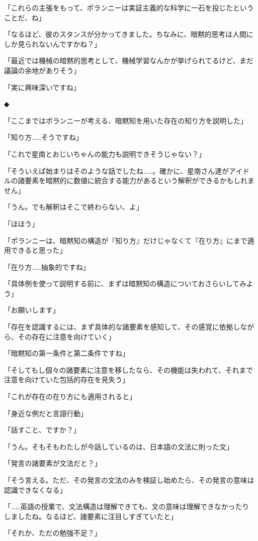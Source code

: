 \documentclass[paper=b5j]{jlreq}
\begin{document}
「これらの主張をもって、ポランニーは実証主義的な科学に一石を投じたということだ、ね」

「なるほど、彼のスタンスが分かってきました。ちなみに、暗黙的思考は人間にしか見られないんですかね？」

「最近では機械の暗黙的思考として、機械学習なんかが挙げられてるけど、まだ議論の余地がありそう」

「実に興味深いですね」

◆

「ここまではポランニーが考える、暗黙知を用いた存在の知り方を説明した」

「知り方……そうですね」

「これで星南とおじいちゃんの能力も説明できそうじゃない？」

「そういえば始まりはそのような話でしたね……。確かに、星南さん達がアイドルの諸要素を暗黙的に数値に統合する能力があるという解釈ができるかもしれません」

「うん。でも解釈はそこで終わらない、よ」

「ほほう」

「ポランニーは、暗黙知の構造が『知り方』だけじゃなくて『在り方』にまで適用できると思った」

「在り方……抽象的ですね」

「具体例を使って説明する前に、まずは暗黙知の構造についておさらいしてみよう」

「お願いします」

「存在を認識するには、まず具体的な諸要素を感知して、その感覚に依拠しながら、その存在に注意を向けていく」

「暗黙知の第一条件と第二条件ですね」

「そしてもし個々の諸要素に注意を移したなら、その機能は失われて、それまで注意を向けていた包括的存在を見失う」

「これが存在の在り方にも適用されると」

「身近な例だと言語行動」

「話すこと、ですか？」

「うん。そもそもわたしが今話しているのは、日本語の文法に則った文」

「発言の諸要素が文法だと？」

「そう言える。ただ、その発言の文法のみを検証し始めたら、その発言の意味は認識できなくなる」

「……英語の授業で、文法構造は理解できても、文の意味は理解できなかったりしましたね。なるほど、諸要素に注目しすぎていたと」

「それか、ただの勉強不足？」
\end{document}
